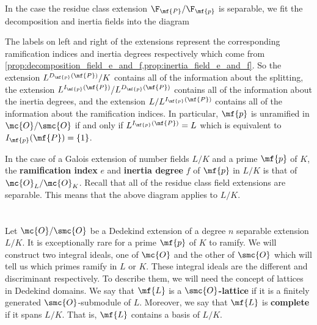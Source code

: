     In the case the residue class extension \(\F_{\mf{P}}/\F_{\mf{p}}\) is separable, we fit the decomposition and inertia fields into the diagram
    \begin{center}
    \end{center}
    The labels on left and right of the extensions represent the corresponding ramification indices and inertia degrees respectively which come from \cref{prop:decomposition_field_e_and_f,prop:inertia_field_e_and_f}. So the extension \(L^{D_{\mf{p}}(\mf{P})}/K\) contains all of the information about the splitting, the extension \(L^{I_{\mf{p}}(\mf{P})}/L^{D_{\mf{p}}(\mf{P})}\) contains all of the information about the inertia degrees, and the extension \(L/L^{I_{\mf{p}}(\mf{P})}\) contains all of the information about the ramification indices. In particular, \(\mf{p}\) is unramified in \(\mc{O}/\smc{O}\) if and only if \(L^{I_{\mf{p}}(\mf{P})} = L\) which is equivalent to \(I_{\mf{p}}(\mf{P}) = \{1\}\).

    In the case of a Galois extension of number fields \(L/K\) and a prime \(\mf{p}\) of \(K\), the \textbf{ramification index} \(e\) and \textbf{inertia degree} \(f\) of \(\mf{p}\) in \(L/K\) is that of \(\mc{O}_{L}/\mc{O}_{K}\). Recall that all of the residue class field extensions are separable. This means that the above diagram applies to \(L/K\).
  \iffalse\section{}
    Let \(\mc{O}/\smc{O}\) be a Dedekind extension of a degree \(n\) separable extension \(L/K\). It is exceptionally rare for a prime \(\mf{p}\) of \(K\) to ramify. We will construct two integral ideals, one of \(\mc{O}\) and the other of \(\smc{O}\) which will tell us which primes ramify in \(L\) or \(K\). These integral ideals are the different and discriminant respectively. To describe them, we will need the concept of lattices in Dedekind domains. We say that \(\mf{L}\) is a \textbf{\(\smc{O}\)-lattice} if it is a finitely generated \(\smc{O}\)-submodule of \(L\). Moreover, we say that \(\mf{L}\) is \textbf{complete} if it spans \(L/K\). That is, \(\mf{L}\) contains a basis of \(L/K\).

